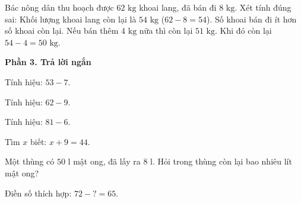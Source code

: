 \begin{ex} %
Bác nông dân thu hoạch được $62\text{ kg}$ khoai lang, đã bán đi $8\text{ kg}$. Xét tính đúng sai:
\choiceTF
{\True Khối lượng khoai lang còn lại là $54\text{ kg}$ ($62 - 8 = 54$).}
{\True Số khoai bán đi ít hơn số khoai còn lại.}
{Nếu bán thêm $4\text{ kg}$ nữa thì còn lại $51\text{ kg}$.}
{\True Khi đó còn lại $54 - 4 = 50\text{ kg}$.}
\end{ex}

\textbf{Phần 3. Trả lời ngắn}

\begin{ex} %
Tính hiệu: $53 - 7$.
\end{ex}

\begin{ex} %
Tính hiệu: $62 - 9$.
\end{ex}

\begin{ex} %
Tính hiệu: $81 - 6$.
\end{ex}

\begin{ex} %
Tìm $x$ biết: $x + 9 = 44$.
\end{ex}

\begin{ex} %
Một thùng có $50\text{ l}$ mật ong, đã lấy ra $8\text{ l}$. Hỏi trong thùng còn lại bao nhiêu lít mật ong?
\end{ex}

\begin{ex} %
Điền số thích hợp: $72 - ? = 65$.
\end{ex}
